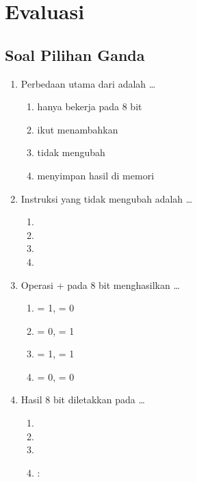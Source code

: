 \section{Evaluasi}
\label{sec:evaluasi-bab10}

\subsection{Soal Pilihan Ganda}

\begin{enumerate}
    \item Perbedaan utama  dari  adalah \dots
          \begin{enumerate}
              \item {} hanya bekerja pada 8 bit
              \item {} ikut menambahkan 
              \item {} tidak mengubah 
              \item {} menyimpan hasil di memori
          \end{enumerate}

    \item Instruksi yang tidak mengubah  adalah \dots
          \begin{enumerate}
              \item {} \item {}
              \item {} \item {}
          \end{enumerate}

    \item Operasi  +  pada 8 bit menghasilkan
          \dots
          \begin{enumerate}
              \item {} = 1,  = 0
              \item {} = 0,  = 1
              \item {} = 1,  = 1
              \item {} = 0,  = 0
          \end{enumerate}

    \item Hasil  8 bit diletakkan pada \dots
          \begin{enumerate}
              \item {} \item {}
              \item {} \item {}:
          \end{enumerate}


\end{enumerate}
